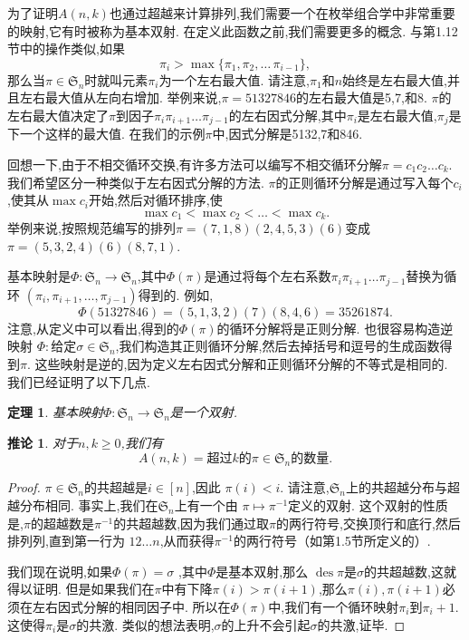 \documentclass[a4paper,12pt]{ctexbook}
\newtheorem{theorem}[lemma]{\hspace{2em}定理}%
\newtheorem{corollary}[lemma]{\hspace{2em}推论}
\begin{document}
为了证明$A(n,k)$也通过超越来计算排列,我们需要一个在枚举组合学中非常重要的映射,它有时被称为基本双射.  在定义此函数之前,我们需要更多的概念.  与第1.12节中的操作类似,如果
$$\pi_i>\max\{\pi_{1},\pi_{2},\dots\,\pi_{i-1}\},$$
那么当$\pi \in \mathfrak{S}_{n}$时就叫元素$\pi_i$为一个{\kaishu 左右最大值}.  
请注意,$\pi_{1}$和$n$始终是左右最大值,并且左右最大值从左向右增加.  
举例来说,$\pi=51327846$的左右最大值是5,7,和8. $\pi$的左右最大值决定了$\pi$到因子$\pi_{i}\pi_{i+1}\dots\pi_{j-1}$的左右因式分解,其中$\pi_i$是左右最大值,$\pi_j$是下一个这样的最大值.  在我们的示例$\pi$中,因式分解是5132,7和846.  

回想一下,由于不相交循环交换,有许多方法可以编写不相交循环分解$\pi=c_{1}c_{2}\dots c_{k}$.  我们希望区分一种类似于左右因式分解的方法.  $\pi$的{\kaishu 正则循环分解}是通过写入每个$c_{i}$,使其从$\max c_i$开始,然后对循环排序,使
$$\max c_{1}<\max c_{2}<\dots<\max c_{k}. $$
举例来说,按照规范编写的排列$\pi=(7,1,8)(2,4,5,3)(6)$变成$\pi=(5,3,2,4)(6)(8,7,1)$. 

{\kaishu 基本映射}是$\Phi: \mathfrak{S}_{n} \rightarrow \mathfrak{S}_{n}$,其中$\Phi (\pi)$是通过将每个左右系数$\pi_{i}\pi_{i+1}\dots\pi_{j-1}$替换为循环
$(\pi_{i},\pi_{i+1},\dots,\pi_{j-1})$得到的. 例如,
$$\Phi (51327846)=(5,1,3,2)(7)(8,4,6)=35261874. $$
注意,从定义中可以看出,得到的$\Phi (\pi)$的循环分解将是正则分解.  
也很容易构造逆映射
$\Phi: \text{给定}\sigma\in\mathfrak{S}_{n}$,我们构造其正则循环分解,然后去掉括号和逗号的生成函数得到$\pi$.  这些映射是逆的,因为定义左右因式分解和正则循环分解的不等式是相同的.  我们已经证明了以下几点.  
\begin{theorem}
	基本映射$\Phi: \mathfrak{S}_{n} \rightarrow \mathfrak{S}_{n}$是一个双射.  
\end{theorem}
\begin{corollary}
	对于$n,k\ge 0$,我们有
	$$A(n,k)=\text{超过}k\text{的}\pi \in\mathfrak{S}_{n}\text{的数量}. $$
\end{corollary}
\begin{proof}
	$\pi \in\mathfrak{S}_{n}$的{\kaishu 共超越}是$i\in [n]$,因此
	$\pi(i)<i$.  请注意,$\mathfrak{S}_{n}$上的共超越分布与超越分布相同.  事实上,我们在$\mathfrak{S}_{n}$上有一个由
	$\pi\mapsto \pi^{-1}$定义的双射.  这个双射的性质是,$\pi $的超越数是$\pi^{-1}$的共超越数,因为我们通过取$\pi $的两行符号,交换顶行和底行,然后排列列,直到第一行为
	$12\dots n$,从而获得$\pi^{-1}$的两行符号（如第1.5节所定义的）. 
	
	我们现在说明,如果$\Phi(\pi)=\sigma$ ,其中$\Phi$是基本双射,那么
	$\operatorname{des}\pi$是$\sigma$的共超越数,这就得以证明.  但是如果我们在$\pi $中有下降$\pi(i)>\pi(i+1)$,那么$\pi(i),\pi(i+1)$必须在左右因式分解的相同因子中.  所以在$\Phi(\pi)$中,我们有一个循环映射$\pi_i$到$\pi_i+1$.  这使得$\pi_i$是$\sigma$的共激.  类似的想法表明,$\sigma$的上升不会引起$\sigma$的共激,证毕.  
\end{proof}
\end{document}
